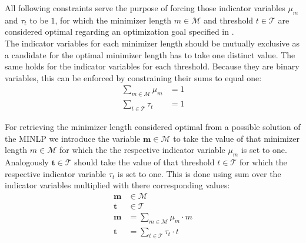 \documentclass[a4paper,titlepage,onecolumn,oneside,12pt,nenglish,titlepage=firstiscover]{scrbook}
\theoremstyle{plain} %
\theoremstyle{definition} %
\theoremstyle{remark} %
\theoremstyle{plain}
\newcommand{\minimizerLength}{m}
\newcommand{\threshold}{t}
\newcommand{\possibleMinimizerLengths}{\mathcal{M}}
\newcommand{\possibleThresholds}{\mathcal{T}}
\newcommand{\indicatorm}{\mu}
\newcommand{\indicatort}{\tau}
\newcommand{\varMinimizerLength}{\textbf{\minimizerLength}}
\newcommand{\varThreshold}{\textbf{\threshold}}
\begin{document}
All following constraints serve the purpose of forcing those indicator variables $\indicatorm_\minimizerLength$ and $\indicatort_\threshold$ to be $1$, for which the minimizer length $\minimizerLength \in \possibleMinimizerLengths$ and threshold $\threshold \in \possibleThresholds$ are considered optimal regarding an optimization goal specified in .\\
The indicator variables for each minimizer length should be mutually exclusive as a candidate for the optimal minimizer length has to take one distinct value. The same holds for the indicator variables for each threshold. Because they are binary variables, this can be enforced by constraining their sums to equal one:
\newcommand{\mututallyExclusiveM}{\sum\limits_{\minimizerLength \in \possibleMinimizerLengths} \indicatorm_\minimizerLength &= 1}
\newcommand{\mututallyExclusiveT}{\sum\limits_{\threshold \in \possibleThresholds} \indicatort_\threshold &= 1}
\begin{align}
	\mututallyExclusiveM \label{constraint:mututallyExclusiveM}\\
	\mututallyExclusiveT \label{constraint:mututallyExclusiveT}
\end{align}

For retrieving the minimizer length considered optimal from a possible solution of the MINLP we introduce the variable $\varMinimizerLength \in \possibleMinimizerLengths$ to take the value of that minimizer length $\minimizerLength \in \possibleMinimizerLengths$ for which the the respective indicator variable $\indicatorm_\minimizerLength$ is set to one. Analogously $\varThreshold \in \possibleThresholds$ should take the value of that threshold $\threshold \in \possibleThresholds$ for which the respective indicator variable $\indicatort_\threshold$ is set to one. This is done using sum over the indicator variables multiplied with there corresponding values:
\newcommand{\optimalM}{\varMinimizerLength &= \sum\limits_{\minimizerLength \in \possibleMinimizerLengths} \indicatorm_\minimizerLength \cdot \minimizerLength}
\newcommand{\optimalT}{\varThreshold &= \sum\limits_{\threshold \in \possibleThresholds} \indicatort_\threshold \cdot \threshold}
\begin{align}
	\varMinimizerLength &\in \possibleMinimizerLengths \label{variable:optimalM}\\
	\varThreshold &\in \possibleThresholds \label{variable:optimalT}\\
	\optimalM \label{constraint:optimalM}\\
	\optimalT \label{constraint:optimalT}
\end{align}
\end{document}
